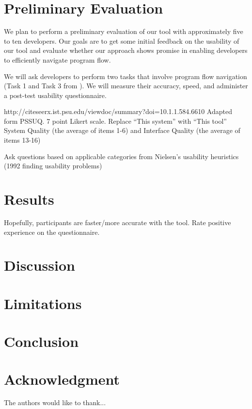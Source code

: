 \documentclass[conference]{IEEEtran}
\begin{document}
\section{Preliminary Evaluation}
We plan to perform a preliminary evaluation of our tool with approximately five to ten developers.
Our goals are to get some initial feedback on the usability of our tool and evaluate whether our approach shows promise in enabling developers to efficiently navigate program flow. 

We will ask developers to perform two tasks that involve program flow navigation (Task 1 and Task 3 from \cite{Smith2015}).
We will measure their accuracy, speed, and administer a post-test usability questionnaire. 

http://citeseerx.ist.psu.edu/viewdoc/summary?doi=10.1.1.584.6610
Adapted form PSSUQ. 7 point Likert scale. Replace “This system” with “This tool”	
System Quality (the average of items 1-6) and Interface Quality (the average of items 13-16)

Ask questions based on applicable categories from Nielsen’s usability heuristics (1992 finding usability problems)
\section{Results}
Hopefully, participants are faster/more accurate with the tool. Rate positive experience on the questionnaire.

\section{Discussion}

\section{Limitations}

\section{Conclusion}

\section*{Acknowledgment}

The authors would like to thank...





\end{document}
